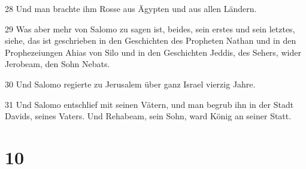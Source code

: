\par 28 Und man brachte ihm Rosse aus Ägypten und aus allen Ländern.
\par 29 Was aber mehr von Salomo zu sagen ist, beides, sein erstes und sein letztes, siehe, das ist geschrieben in den Geschichten des Propheten Nathan und in den Prophezeiungen Ahias von Silo und in den Geschichten Jeddis, des Sehers, wider Jerobeam, den Sohn Nebats.
\par 30 Und Salomo regierte zu Jerusalem über ganz Israel vierzig Jahre.
\par 31 Und Salomo entschlief mit seinen Vätern, und man begrub ihn in der Stadt Davids, seines Vaters. Und Rehabeam, sein Sohn, ward König an seiner Statt.

\chapter{10}

